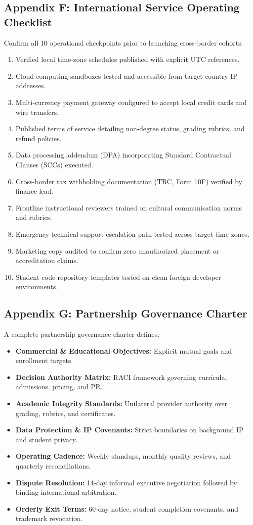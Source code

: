 \subsection*{Appendix F: International Service Operating Checklist}
\label{sec:app_international_service_checklist}

Confirm all 10 operational checkpoints prior to launching cross-border cohorts:
\begin{enumerate}
\item Verified local time-zone schedules published with explicit UTC references.
\item Cloud computing sandboxes tested and accessible from target country IP addresses.
\item Multi-currency payment gateway configured to accept local credit cards and wire transfers.
\item Published terms of service detailing non-degree status, grading rubrics, and refund policies.
\item Data processing addendum (DPA) incorporating Standard Contractual Clauses (SCCs) executed.
\item Cross-border tax withholding documentation (TRC, Form 10F) verified by finance lead.
\item Frontline instructional reviewers trained on cultural communication norms and rubrics.
\item Emergency technical support escalation path tested across target time zones.
\item Marketing copy audited to confirm zero unauthorized placement or accreditation claims.
\item Student code repository templates tested on clean foreign developer environments.
\end{enumerate}

\subsection*{Appendix G: Partnership Governance Charter}
\label{sec:app_governance_charter}

A complete partnership governance charter defines:
\begin{itemize}
\item \textbf{Commercial \& Educational Objectives:} Explicit mutual goals and enrollment targets.
\item \textbf{Decision Authority Matrix:} RACI framework governing curricula, admissions, pricing, and PR.
\item \textbf{Academic Integrity Standards:} Unilateral provider authority over grading, rubrics, and certificates.
\item \textbf{Data Protection \& IP Covenants:} Strict boundaries on background IP and student privacy.
\item \textbf{Operating Cadence:} Weekly standups, monthly quality reviews, and quarterly reconciliations.
\item \textbf{Dispute Resolution:} 14-day informal executive negotiation followed by binding international arbitration.
\item \textbf{Orderly Exit Terms:} 60-day notice, student completion covenants, and trademark revocation.
\end{itemize}

